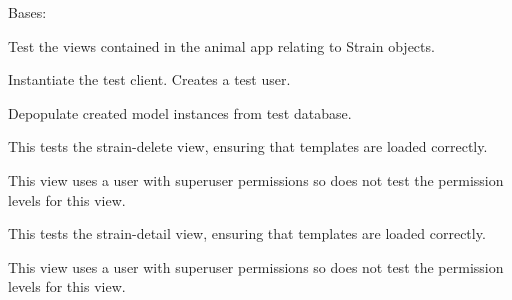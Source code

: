 \documentclass[letterpaper,10pt,english]{sphinxmanual}
\begin{document}
\begin{fulllineitems}
\label{api:mousedb.animal.tests.StrainViewTests}
Bases: 

Test the views contained in the animal app relating to Strain objects.


\begin{fulllineitems}
\label{api:mousedb.animal.tests.StrainViewTests.setUp}
Instantiate the test client.  Creates a test user.

\end{fulllineitems}



\begin{fulllineitems}
\label{api:mousedb.animal.tests.StrainViewTests.tearDown}
Depopulate created model instances from test database.

\end{fulllineitems}



\begin{fulllineitems}
\label{api:mousedb.animal.tests.StrainViewTests.test_strain_delete}
This tests the strain-delete view, ensuring that templates are loaded correctly.

This view uses a user with superuser permissions so does not test the permission levels for this view.

\end{fulllineitems}



\begin{fulllineitems}
\label{api:mousedb.animal.tests.StrainViewTests.test_strain_detail}
This tests the strain-detail view, ensuring that templates are loaded correctly.

This view uses a user with superuser permissions so does not test the permission levels for this view.


\end{fulllineitems}
\end{fulllineitems}
\end{document}

